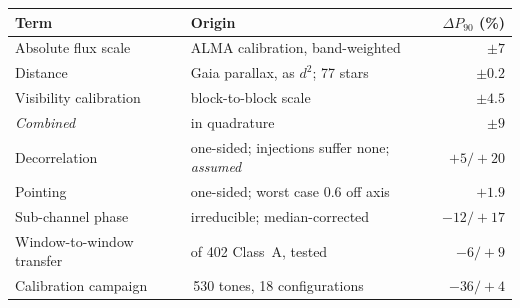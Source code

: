 \begin{tabular}{@{}l@{~}>{\raggedright\arraybackslash}p{}@{~}r@{}}
\hline
Term & Origin & $\Delta P_{90}$ (\%) \\
\hline
Absolute flux scale & ALMA calibration, band-weighted & $\pm7$ \\
Distance & Gaia parallax, as $d^{2}$; 77 stars & $\pm0.2$ \\
Visibility calibration & block-to-block scale & $\pm4.5$ \\
\hline
\emph{Combined} & in quadrature & $\pm9$ \\
\hline
Decorrelation & one-sided; injections suffer none; \emph{assumed} & $+5/+20$ \\
Pointing & one-sided; worst case 0.6\arcsec{} off axis & $+1.9$ \\
Sub-channel phase & irreducible; median-corrected & $-12/+17$ \\
Window-to-window transfer & 13 of 402 Class~A, tested & $-6/+9$ \\
Calibration campaign & 3\,530 tones, 18 configurations & $-36/+4$ \\
\hline
\end{tabular}
